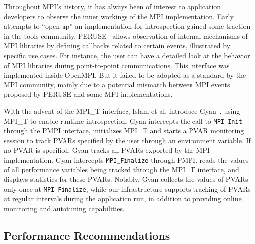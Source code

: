 Throughout MPI’s history, it has always been of interest to application developers to observe the inner workings of the MPI implementation. Early attempts to “open up” an implementation for introspection gained some traction in the tools community.
PERUSE~\cite{keller06} allows observation of internal mechanisms of MPI libraries by defining callbacks related to certain events, illustrated by specific use cases. 
For instance, the user can have a detailed look at the behavior of MPI libraries during point-to-point communications.
This interface was implemented inside OpenMPI. 
But it failed to be adopted as a standard by the MPI community, mainly due to a potential mismatch between MPI events proposed by PERUSE and some MPI implementations. \par
With the advent of the MPI\_T interface, Islam et al. introduce Gyan~\cite{Islam:2014:ECN:2642769.2642781}, using MPI\_T to enable runtime introspection. Gyan intercepts the call to \verb+MPI_Init+ through the PMPI interface, initializes MPI\_T and starts a PVAR monitoring session to track PVARs specified by the user through an environment variable. If no PVAR is specified, Gyan tracks all PVARs exported by the MPI implementation. Gyan intercepts \verb+MPI_Finalize+ through PMPI, reads the values of all performance variables being tracked through the MPI\_T interface, and displays statistics for these PVARs. Notably, Gyan collects the values of PVARs only once at \verb+MPI_Finalize+, while our infrastructure supports tracking of PVARs at regular intervals during the application run, in addition to providing online monitoring and autotuning capabilities.

\subsection{Performance Recommendations}

